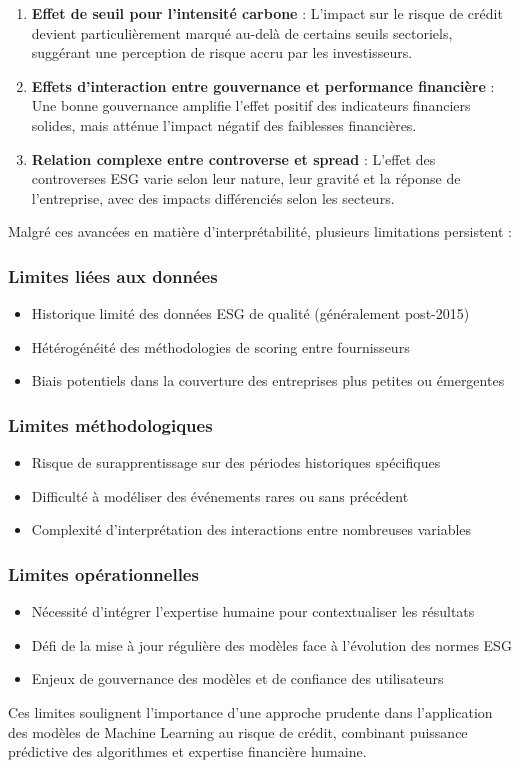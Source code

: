 \begin{enumerate}
  \item \textbf{Effet de seuil pour l'intensité carbone} : L'impact sur le risque de crédit devient particulièrement marqué au-delà de certains seuils sectoriels, suggérant une perception de risque accru par les investisseurs.

  \item \textbf{Effets d'interaction entre gouvernance et performance financière} : Une bonne gouvernance amplifie l'effet positif des indicateurs financiers solides, mais atténue l'impact négatif des faiblesses financières.

  \item \textbf{Relation complexe entre controverse et spread} : L'effet des controverses ESG varie selon leur nature, leur gravité et la réponse de l'entreprise, avec des impacts différenciés selon les secteurs.
\end{enumerate}

Malgré ces avancées en matière d'interprétabilité, plusieurs limitations persistent :

\subsubsection{Limites liées aux données}
\begin{itemize}
  \item Historique limité des données ESG de qualité (généralement post-2015)
  \item Hétérogénéité des méthodologies de scoring entre fournisseurs
  \item Biais potentiels dans la couverture des entreprises plus petites ou émergentes
\end{itemize}

\subsubsection{Limites méthodologiques}
\begin{itemize}
  \item Risque de surapprentissage sur des périodes historiques spécifiques
  \item Difficulté à modéliser des événements rares ou sans précédent
  \item Complexité d'interprétation des interactions entre nombreuses variables
\end{itemize}

\subsubsection{Limites opérationnelles}
\begin{itemize}
  \item Nécessité d'intégrer l'expertise humaine pour contextualiser les résultats
  \item Défi de la mise à jour régulière des modèles face à l'évolution des normes ESG
  \item Enjeux de gouvernance des modèles et de confiance des utilisateurs
\end{itemize}

Ces limites soulignent l'importance d'une approche prudente dans l'application des modèles de Machine Learning au risque de crédit, combinant puissance prédictive des algorithmes et expertise financière humaine.